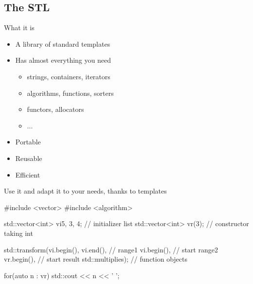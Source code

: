 \subsection[STL]{The STL}

\begin{frame}[fragile]
  \begin{block}{What it is}
    \begin{itemize}
    \item A library of standard templates
    \item Has almost everything you need
      \begin{itemize}
      \item strings, containers, iterators
      \item algorithms, functions, sorters
      \item functors, allocators
      \item ...
      \end{itemize}
    \item Portable
    \item Reusable
    \item Efficient
    \end{itemize}
  \end{block}
  \pause
  \begin{exampleblock}{Use it}
    and adapt it to your needs, thanks to templates
  \end{exampleblock}
\end{frame}

\begin{frame}[fragile,label=STLcode]
  \begin{cppcode*}{}
    #include <vector>
    #include <algorithm>

    std::vector<int> vi{5, 3, 4}; // initializer list
    std::vector<int> vr(3); // constructor taking int

    std::transform(vi.begin(), vi.end(),      // range1
                   vi.begin(),          // start range2
                   vr.begin(),          // start result
                   std::multiplies{}); // function objects

    for(auto n : vr) {
      std::cout << n << ' ';
    }
  \end{cppcode*}
\end{frame}

